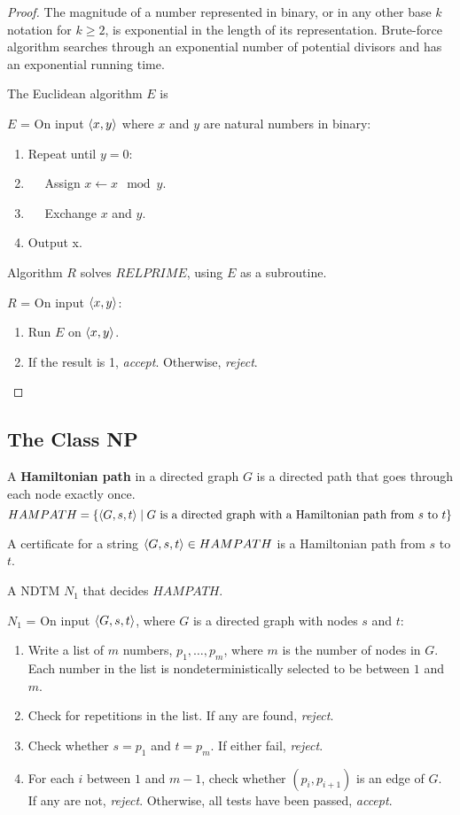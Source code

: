 \begin{mdframed}
\begin{proof}
The magnitude of a number represented in binary, or in any other base $k$ notation for $k \geq 2$, is exponential in the length of its representation. Brute-force algorithm searches through an exponential number of potential divisors and has an exponential running time.

\medskip
The Euclidean algorithm $E$ is 

\medskip
$E$ = On input $\langle{x,y}\rangle$ where $x$ and $y$ are natural numbers in binary:
\begin{enumerate}
\item Repeat until $y=0$:
\item $\quad$ Assign $x \leftarrow x \mod y$.
\item $\quad$ Exchange $x$ and $y$.
\item Output x.
\end{enumerate}

Algorithm $R$ solves $RELPRIME$, using $E$ as a subroutine.

\medskip
$R$ = On input $\langle{x, y}\rangle$:
\begin{enumerate}
\item Run $E$ on $\langle{x, y}\rangle$.
\item If the result is 1, \textit{accept}. Otherwise, \textit{reject}.
\end{enumerate}
\end{proof}
\end{mdframed}

\subsection{The Class NP}
A \textbf{Hamiltonian path} in a directed graph $G$ is a directed path that goes through each node exactly once. 
\[
HAMPATH = \{\langle{G, s, t}\rangle \mid \text{$G$ is a directed graph with a Hamiltonian path from $s$ to $t$}\}
\]
\label{lang:HAMPATH_NP}
\begin{mdframed}
A certificate for a string $\langle{ G, s, t}\rangle \in HAMPATH$ is a Hamiltonian path from $s$ to $t$.

A NDTM $N_1$ that decides $HAMPATH$.

\medskip
$N_1$ = On input $\langle{G, s, t}\rangle$, where $G$ is a directed graph with nodes $s$ and $t$:
\begin{enumerate}
\item Write a list of $m$ numbers, $p_1, \ldots, p_m$, where $m$ is the number of nodes in $G$. Each number in the list is nondeterministically selected to be between $1$ and $m$.
\item Check for repetitions in the list. If any are found, \textit{reject}.
\item Check whether $s= p_1$ and $t=p_m$. If either fail, \textit{reject}.
\item For each $i$ between $1$ and $m-1$, check whether $(p_i, p_{i+1})$ is an edge of $G$. If any are not, \textit{reject}. Otherwise, all tests have been passed, \textit{accept}.
\end{enumerate}
\end{mdframed}

